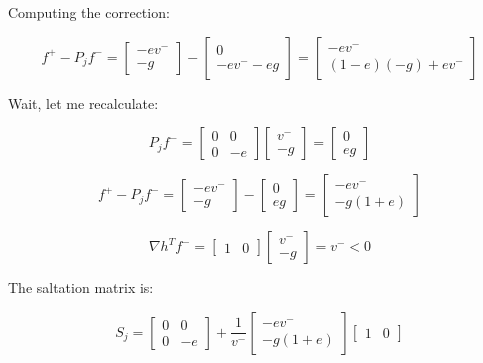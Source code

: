 \documentclass[
  letterpaper,
  DIV=11,
  numbers=noendperiod]{scrartcl}
\begin{document}
Computing the correction:

\[
f^+ - P_j f^- = \begin{bmatrix} -ev^- \\ -g \end{bmatrix} - \begin{bmatrix} 0 \\ -ev^- - eg \end{bmatrix} = \begin{bmatrix} -ev^- \\ (1-e)(-g) + ev^- \end{bmatrix}
\]

Wait, let me recalculate:

\[
P_j f^- = \begin{bmatrix} 0 & 0 \\ 0 & -e \end{bmatrix} \begin{bmatrix} v^- \\ -g \end{bmatrix} = \begin{bmatrix} 0 \\ eg \end{bmatrix}
\]

\[
f^+ - P_j f^- = \begin{bmatrix} -ev^- \\ -g \end{bmatrix} - \begin{bmatrix} 0 \\ eg \end{bmatrix} = \begin{bmatrix} -ev^- \\ -g(1+e) \end{bmatrix}
\]

\[
\nabla h^T f^- = \begin{bmatrix} 1 & 0 \end{bmatrix} \begin{bmatrix} v^- \\ -g \end{bmatrix} = v^- < 0
\]

The saltation matrix is:

\[
S_j = \begin{bmatrix} 0 & 0 \\ 0 & -e \end{bmatrix} + \frac{1}{v^-} \begin{bmatrix} -ev^- \\ -g(1+e) \end{bmatrix} \begin{bmatrix} 1 & 0 \end{bmatrix}
\]
\end{document}
